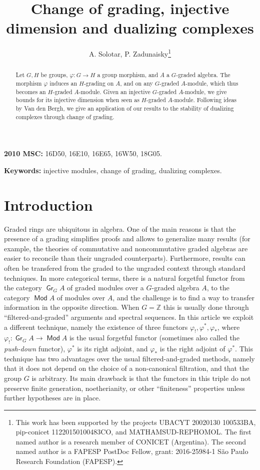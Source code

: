 \documentclass[11pt,fleqn]{article}
\title{
Change of grading, injective dimension and dualizing complexes
}
\author{A. Solotar,
P. Zadunaisky\footnote{This work has been supported by the projects 
UBACYT 20020130 100533BA, pip-conicet 11220150100483CO, and 
MATHAMSUD-REPHOMOL. The first named author is a research member of CONICET 
(Argentina). The second named author is a FAPESP PostDoc Fellow, grant: 
2016-25984-1 S\~ao Paulo Research Foundation (FAPESP).}
}
\date{}
\newcommand\ZZ{\mathbb Z}
\renewcommand\to{\longrightarrow}
\renewcommand\phi{\varphi}
\DeclareMathOperator\Mod{\mathsf{Mod}}
\DeclareMathOperator\Gr{\mathsf{Gr}}
\begin{document}
\maketitle

\begin{abstract}
Let $G,H$ be groups, $\phi: G \to H$ a group morphism, and $A$ a $G$-graded 
algebra. The morphism $\phi$ induces an $H$-grading on $A$, and on any 
$G$-graded $A$-module, which thus becomes an $H$-graded $A$-module.
Given an injective $G$-graded $A$-module, we give bounds for its injective
dimension when seen as $H$-graded $A$-module. Following ideas by Van den
Bergh, we give an application of our results to the stability of dualizing
complexes through change of grading.
\end{abstract}

\textbf{2010 MSC:} 16D50, 16E10, 16E65, 16W50, 18G05.

\textbf{Keywords:} injective modules, change of grading, dualizing complexes.

\section{Introduction}
Graded rings are ubiquitous in algebra. One of the main reasons is that the
presence of a grading simplifies proofs and allows to generalize many results
(for example, the theories of commutative and noncommutative graded algebras 
are easier to reconcile than their ungraded counterparts). Furthermore, 
results can often be transfered from the graded to the ungraded context 
through standard techniques. In more categorical terms, there is a natural 
forgetful functor from the category $\Gr_G A$ of graded modules over a 
$G$-graded algebra $A$, to the category $\Mod A$ of modules over $A$, and the 
challenge is to find a way to transfer information in the opposite direction. 
When $G = \ZZ$ this is usually done through ``filtered-and-graded'' arguments 
and spectral sequences. In this article we exploit a different technique, 
namely the existence of three functors $\phi_!, \phi^*, \phi_*$, where 
$\phi_!: \Gr_G A \to \Mod A$ is the usual forgetful functor (sometimes also 
called the \emph{push-down} functor), $\phi^*$ is its right adjoint, and 
$\phi_*$ is the right adjoint of $\phi^*$. 
This technique has two advantages over the usual filtered-and-graded methods, 
namely that it does not depend on the choice of a non-canonical filtration, 
and that the group $G$ is arbitrary. Its main drawback is that the functors in 
this triple do not preserve finite generation, noetherianity, or other 
``finiteness'' properties unless further hypotheses are in place.
\end{document}
